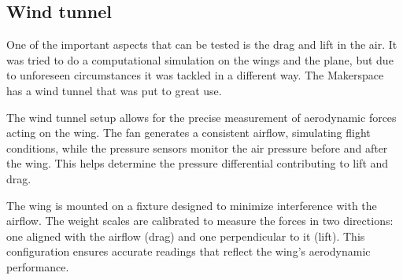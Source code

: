 
\subsection{Wind tunnel}
One of the important aspects that can be tested is the drag and lift in the air. It was tried to do a computational simulation on the wings and the plane, but due to unforeseen circumstances it was tackled in a different way. The Makerspace has a wind tunnel that was put to great use.

The wind tunnel setup allows for the precise measurement of aerodynamic forces acting on the wing. The fan generates a consistent airflow, simulating flight conditions, while the pressure sensors monitor the air pressure before and after the wing. This helps determine the pressure differential contributing to lift and drag.

The wing is mounted on a fixture designed to minimize interference with the airflow. The weight scales are calibrated to measure the forces in two directions: one aligned with the airflow (drag) and one perpendicular to it (lift). This configuration ensures accurate readings that reflect the wing's aerodynamic performance.

